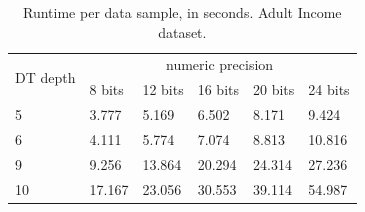 \begin{table}[H]
\centering
\caption{Runtime per data sample, in seconds. Adult Income dataset.}
\label{table:runtimeDTAI}
\begin{tabular}{|l|l|l|l|l|l|}
\hline
\multirow{2}{*}{DT depth} & \multicolumn{5}{c|}{numeric precision}         \\ \cline{2-6} 
                          & 8 bits & 12 bits & 16 bits & 20 bits & 24 bits \\ \hline
5                         & 3.777  & 5.169   & 6.502   & 8.171   & 9.424   \\ \hline
6                         & 4.111  & 5.774   & 7.074   & 8.813   & 10.816  \\ \hline
9                         & 9.256  & 13.864  & 20.294  & 24.314  & 27.236  \\ \hline
10                        & 17.167 & 23.056  & 30.553  & 39.114  & 54.987  \\ \hline
\end{tabular}
\end{table}


